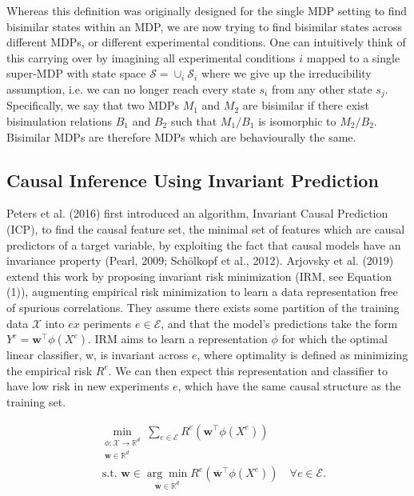 \documentclass[10pt]{article}
\begin{document}
Whereas this definition was originally designed for the single MDP setting to find bisimilar states within an MDP, we are now trying to find bisimilar states across different MDPs, or different experimental conditions. One can intuitively think of this carrying over by imagining all experimental conditions $i$ mapped to a single super-MDP with state space $\mathcal{S}=\cup_{i} \mathcal{S}_{i}$ where we give up the irreducibility assumption, i.e. we can no longer reach every state $s_{i}$ from any other state $s_{j}$. Specifically, we say that two MDPs $M_{1}$ and $M_{2}$ are bisimilar if there exist bisimulation relations $B_{1}$ and $B_{2}$ such that $M_{1} / B_{1}$ is isomorphic to $M_{2} / B_{2}$. Bisimilar MDPs are therefore MDPs which are behaviourally the same.

\subsection{Causal Inference Using Invariant Prediction}
Peters et al. (2016) first introduced an algorithm, Invariant Causal Prediction (ICP), to find the causal feature set, the minimal set of features which are causal predictors of a target variable, by exploiting the fact that causal models have an invariance property (Pearl, 2009; Schölkopf et al., 2012). Arjovsky et al. (2019) extend this work by proposing invariant risk minimization (IRM, see Equation (1)), augmenting empirical risk minimization to learn a data representation free of spurious correlations. They assume there exists some partition of the training data $\mathcal{X}$ into $e x$ periments $e \in \mathcal{E}$, and that the model's predictions take the form $Y^{e}=\mathbf{w}^{\top} \phi\left(X^{e}\right)$. IRM aims to learn a representation $\phi$ for which the optimal linear classifier, w, is invariant across $e$, where optimality is defined as minimizing the empirical risk $R^{e}$. We can then expect this representation and classifier to have low risk in new experiments $e$, which have the same causal structure as the training set.

\[
\begin{aligned}
& \min _{\substack{\phi: \mathcal{X} \rightarrow \mathbb{R}^{d} \\
\mathbf{w} \in \mathbb{R}^{d}}} \sum_{e \in \mathcal{E}} R^{e}\left(\mathbf{w}^{\top} \phi\left(X^{e}\right)\right) \\
& \text { s.t. } \mathbf{w} \in \underset{\overline{\mathbf{w}} \in \mathbb{R}^{d}}{\arg \min } R^{e}\left(\overline{\mathbf{w}}^{\top} \phi\left(X^{e}\right)\right) \quad \forall e \in \mathcal{E} .
\end{aligned}
\]
\end{document}
